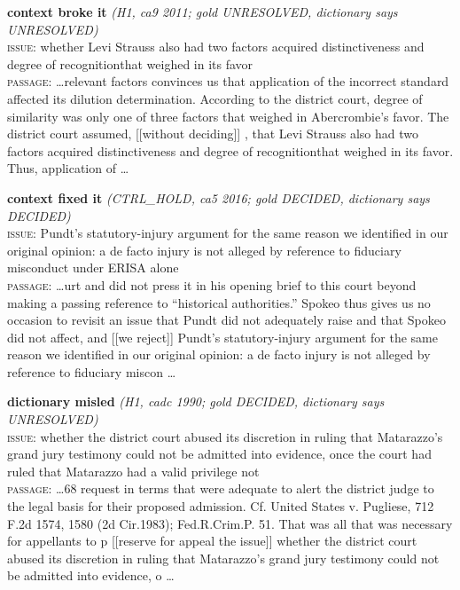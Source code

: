 \textbf{context broke it} \emph{(H1, ca9 2011; gold UNRESOLVED, dictionary says UNRESOLVED)}\\
\textsc{issue}: whether Levi Strauss also had two factors acquired distinctiveness and degree of recognitionthat weighed in its favor\\
\textsc{passage}: \dots relevant factors convinces us that application of the incorrect standard affected its dilution determination. According to the district court, degree of similarity was only one of three factors that weighed in Abercrombie's favor. The district court assumed, [[without deciding]] , that Levi Strauss also had two factors acquired distinctiveness and degree of recognitionthat weighed in its favor. Thus, application of \dots
\smallskip

\textbf{context fixed it} \emph{(CTRL\_HOLD, ca5 2016; gold DECIDED, dictionary says DECIDED)}\\
\textsc{issue}: Pundt’s statutory-injury argument for the same reason we identified in our original opinion: a de facto injury is not alleged by reference to fiduciary misconduct under ERISA alone\\
\textsc{passage}: \dots urt and did not press it in his opening brief to this court beyond making a passing reference to “historical authorities.” Spokeo thus gives us no occasion to revisit an issue that Pundt did not adequately raise and that Spokeo did not affect, and [[we reject]] Pundt’s statutory-injury argument for the same reason we identified in our original opinion: a de facto injury is not alleged by reference to fiduciary miscon \dots
\smallskip

\textbf{dictionary misled} \emph{(H1, cadc 1990; gold DECIDED, dictionary says UNRESOLVED)}\\
\textsc{issue}: whether the district court abused its discretion in ruling that Matarazzo’s grand jury testimony could not be admitted into evidence, once the court had ruled that Matarazzo had a valid privilege not \\
\textsc{passage}: \dots 68 request in terms that were adequate to alert the district judge to the legal basis for their proposed admission. Cf. United States v. Pugliese, 712 F.2d 1574, 1580 (2d Cir.1983); Fed.R.Crim.P. 51. That was all that was necessary for appellants to p [[reserve for appeal the issue]] whether the district court abused its discretion in ruling that Matarazzo’s grand jury testimony could not be admitted into evidence, o \dots
\smallskip
